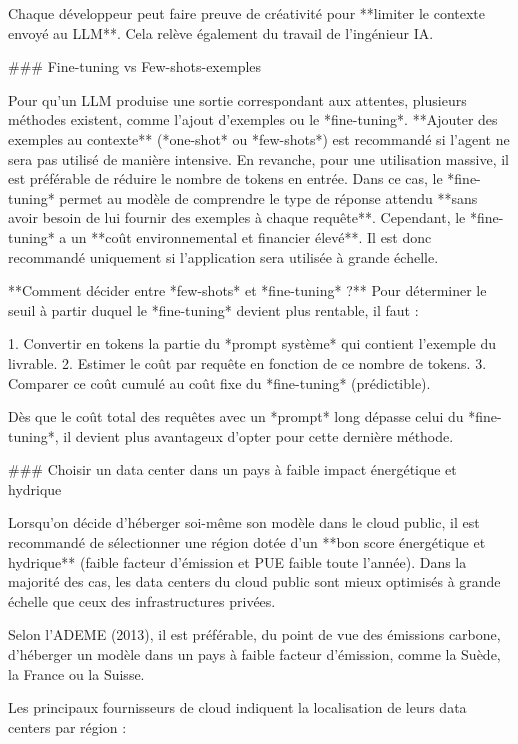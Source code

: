 {Chaque développeur peut faire preuve de créativité pour **limiter le contexte envoyé au LLM**. Cela relève également du travail de l'ingénieur IA.

### Fine-tuning vs Few-shots-exemples

Pour qu'un LLM produise une sortie correspondant aux attentes, plusieurs méthodes existent, comme l'ajout d'exemples ou le *fine-tuning*.
**Ajouter des exemples au contexte** (*one-shot* ou *few-shots*) est recommandé si l'agent ne sera pas utilisé de manière intensive. En revanche, pour une utilisation massive, il est préférable de réduire le nombre de tokens en entrée. Dans ce cas, le *fine-tuning* permet au modèle de comprendre le type de réponse attendu **sans avoir besoin de lui fournir des exemples à chaque requête**. Cependant, le *fine-tuning* a un **coût environnemental et financier élevé**. Il est donc recommandé uniquement si l'application sera utilisée à grande échelle.

**Comment décider entre *few-shots* et *fine-tuning* ?**
Pour déterminer le seuil à partir duquel le *fine-tuning* devient plus rentable, il faut :

1. Convertir en tokens la partie du *prompt système* qui contient l'exemple du livrable.
2. Estimer le coût par requête en fonction de ce nombre de tokens.
3. Comparer ce coût cumulé au coût fixe du *fine-tuning* (prédictible).

Dès que le coût total des requêtes avec un *prompt* long dépasse celui du *fine-tuning*, il devient plus avantageux d'opter pour cette dernière méthode.

### Choisir un data center dans un pays à faible impact énergétique et hydrique

Lorsqu'on décide d'héberger soi-même son modèle dans le cloud public, il est recommandé de sélectionner une région dotée d'un **bon score énergétique et hydrique** (faible facteur d'émission et PUE faible toute l'année). Dans la majorité des cas, les data centers du cloud public sont mieux optimisés à grande échelle que ceux des infrastructures privées.

Selon l'ADEME (2013), il est préférable, du point de vue des émissions carbone, d'héberger un modèle dans un pays à faible facteur d'émission, comme la Suède, la France ou la Suisse.

Les principaux fournisseurs de cloud indiquent la localisation de leurs data centers par région :

}
